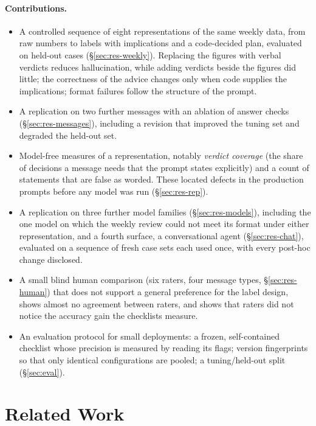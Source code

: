 \documentclass[10pt,twocolumn]{article}
\begin{document}
\paragraph{Contributions.}
\begin{itemize}
\item A controlled sequence of eight representations of the same weekly data, from raw numbers to labels with
implications and a code-decided plan, evaluated on held-out cases (\S\ref{sec:res-weekly}). Replacing the figures
with verbal verdicts reduces hallucination, while adding verdicts beside the figures did little; the correctness of
the advice changes only when code supplies the implications; format failures follow the structure of the prompt.
\item A replication on two further messages with an ablation of answer checks (\S\ref{sec:res-messages}), including a
revision that improved the tuning set and degraded the held-out set.
\item Model-free measures of a representation, notably \emph{verdict coverage} (the share of decisions a message needs
that the prompt states explicitly) and a count of statements that are false as worded. These located defects in the
production prompts before any model was run (\S\ref{sec:res-rep}).
\item A replication on three further model families (\S\ref{sec:res-models}), including the one model on which the weekly
review could not meet its format under either representation, and a fourth surface, a conversational agent
(\S\ref{sec:res-chat}), evaluated on a sequence of fresh case sets each used once, with every post-hoc change disclosed.
\item A small blind human comparison (six raters, four message types, \S\ref{sec:res-human}) that does not support a
general preference for the label design, shows almost no agreement between raters, and shows that raters did not notice
the accuracy gain the checklists measure.
\item An evaluation protocol for small deployments: a frozen, self-contained checklist whose precision is measured by
reading its flags; version fingerprints so that only identical configurations are pooled; a tuning/held-out split
(\S\ref{sec:eval}).
\end{itemize}

\section{Related Work}
\label{sec:related}
\end{document}

